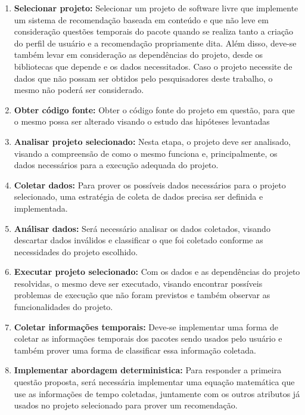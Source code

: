 \begin{enumerate}

    \item \textbf{Selecionar projeto:}
Selecionar um projeto de software livre que implemente um sistema de recomendação baseada em conteúdo e que não leve em consideração questões temporais do pacote quando se realiza tanto
a criação do perfil de usuário e a recomendação propriamente dita. Além disso, deve-se também levar em consideração as dependências do projeto, desde os bibliotecas que depende e os
dados necessitados. Caso o projeto necessite de dados que não possam ser obtidos pelo pesquisadores deste trabalho, o mesmo não poderá ser considerado.

    \item \textbf{Obter código fonte:}
Obter o código fonte do projeto em questão, para que o mesmo possa ser alterado visando o estudo das hipóteses levantadas

    \item \textbf{Analisar projeto selecionado:}
Nesta etapa, o projeto deve ser analisado, visando a compreensão de como o mesmo funciona e, principalmente, os dados necessários para a execução adequada do projeto.

    \item \textbf{Coletar dados:}
Para prover os possíveis dados necessários para o projeto selecionado, uma estratégia de coleta de dados precisa ser definida e implementada.

    \item \textbf{Análisar dados:}
Será necessário analisar os dados coletados, visando descartar dados inválidos e classificar o que foi coletado conforme as necessidades do projeto escolhido.

    \item \textbf{Executar projeto selecionado:}
Com os dados e as dependências do projeto resolvidas, o mesmo deve ser executado, visando encontrar possíveis problemas de execução que não foram previstos e também observar as funcionalidades do projeto.

    \item \textbf{Coletar informações temporais:}
Deve-se implementar uma forma de coletar as informações temporais dos pacotes sendo usados pelo usuário e também prover uma forma de classificar essa informação coletada.

    \item \textbf{Implementar abordagem deterministica:}
Para responder a primeira questão proposta, será necessária implementar uma equação matemática que use as informações de tempo coletadas, juntamente com os outros atributos já usados no projeto selecionado para prover um recomendação.


\end{enumerate}
